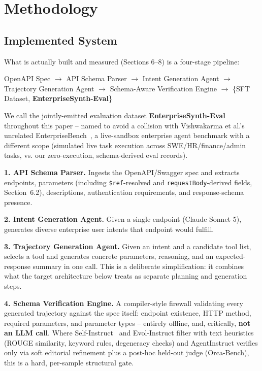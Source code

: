 \documentclass[11pt]{article}
\begin{document}
\section{Methodology}

\subsection{Implemented System}
What is actually built and measured (Sections 6--8) is a four-stage pipeline:

\begin{center}
OpenAPI Spec $\rightarrow$ API Schema Parser $\rightarrow$ Intent Generation Agent
$\rightarrow$ Trajectory Generation Agent $\rightarrow$ Schema-Aware Verification Engine
$\rightarrow$ \{SFT Dataset, \textbf{EnterpriseSynth-Eval}\}
\end{center}

We call the jointly-emitted evaluation dataset \textbf{EnterpriseSynth-Eval} throughout this
paper -- named to avoid a collision with Vishwakarma et al.'s unrelated
EnterpriseBench~\cite{vishwakarma2025enterprisebench}, a live-sandbox enterprise agent benchmark
with a different scope (simulated live task execution across SWE/HR/finance/admin tasks, vs. our
zero-execution, schema-derived eval records).

\textbf{1. API Schema Parser.} Ingests the OpenAPI/Swagger spec and extracts endpoints,
parameters (including \texttt{\$ref}-resolved and \texttt{requestBody}-derived fields, Section~6.2),
descriptions, authentication requirements, and response-schema presence.

\textbf{2. Intent Generation Agent.} Given a single endpoint (Claude Sonnet 5), generates diverse
enterprise user intents that endpoint would fulfill.

\textbf{3. Trajectory Generation Agent.} Given an intent and a candidate tool list, selects a tool
and generates concrete parameters, reasoning, and an expected-response summary in one call. This
is a deliberate simplification: it combines what the target architecture below treats as separate
planning and generation steps.

\textbf{4. Schema Verification Engine.} A compiler-style firewall validating every generated
trajectory against the spec itself: endpoint existence, HTTP method, required parameters, and
parameter types -- entirely offline, and, critically, \textbf{not an LLM call}. Where
Self-Instruct~\cite{wang2022selfinstruct} and Evol-Instruct filter with text heuristics (ROUGE
similarity, keyword rules, degeneracy checks) and AgentInstruct verifies only via soft editorial
refinement plus a post-hoc held-out judge (Orca-Bench), this is a hard, per-sample structural gate.
\end{document}
